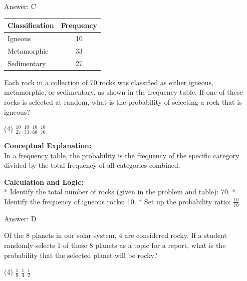 \documentclass[11pt,paper=a4,answers]{exam}
\begin{document}
\begin{questions}
\begin{solution}
\vspace{30pt}

Answer: \colorbox{yellow!100}{C}
\end{solution}

\vspace{60pt}

\question
\begin{center}
\begin{tabular}{|l|c|}
\hline
\textbf{Classification} & \textbf{Frequency} \\ \hline
Igneous & 10 \\ \hline
Metamorphic & 33 \\ \hline
Sedimentary & 27 \\ \hline
\end{tabular}
\end{center}
Each rock in a collection of 70 rocks was classified as either igneous, metamorphic, or sedimentary, as shown in the frequency table. If one of these rocks is selected at random, what is the probability of selecting a rock that is igneous?
\begin{tasks}(4)
    \task $\frac{10}{27}$
    \task $\frac{10}{33}$
    \task $\frac{10}{60}$
    \task $\frac{10}{70}$
\end{tasks}

\begin{solution}
\textbf{Conceptual Explanation:} \\
In a frequency table, the probability is the frequency of the specific category divided by the total frequency of all categories combined.

\vspace{30pt}

\textbf{Calculation and Logic:} \\
* Identify the total number of rocks (given in the problem and table): 70.
* Identify the frequency of igneous rocks: 10.
* Set up the probability ratio: $\frac{10}{70}$.

\vspace{30pt}

Answer: \colorbox{yellow!100}{D}
\end{solution}

\vspace{60pt}

\question
Of the 8 planets in our solar system, 4 are considered rocky. If a student randomly selects 1 of those 8 planets as a topic for a report, what is the probability that the selected planet will be rocky?
\begin{tasks}(4)
    \task $\frac{1}{8}$
    \task $\frac{1}{4}$
    \task $\frac{1}{2}$
\end{tasks}


\end{questions}
\end{document}
